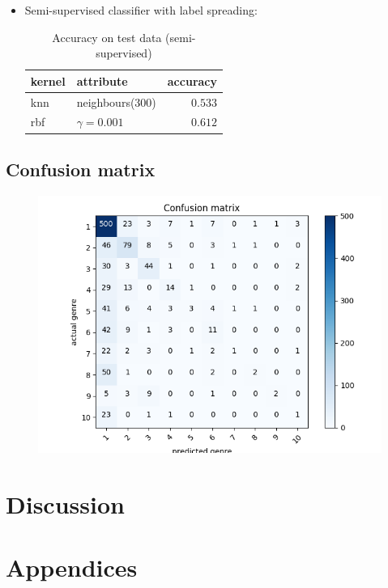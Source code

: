\documentclass[fleqn,10pt]{SelfArx} %
\begin{document}
\begin{itemize}
	\item Semi-supervised classifier with label spreading:
	\begin{table}[H]
		\caption{Accuracy on test data (semi-supervised)}
		\centering
		\begin{tabular}{llr}
			\toprule
			kernel & attribute & accuracy\\ 
			\midrule
			knn & neighbours(300) & $0.533$ \\
			rbf & $\gamma=0.001$ & $0.612$ \\
			\bottomrule
		\end{tabular}
		\label{tab:label}
	\end{table}
\end{itemize}

\subsection{Confusion matrix}
\begin{figure}[H]
	\includegraphics[width=\linewidth]{confusion-matrix.jpg}
\end{figure}

\section{Discussion}

\section{Appendices}
\end{document}
